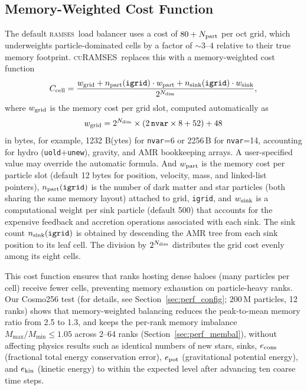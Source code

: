 \documentclass[fleqn,usenatbib]{mnras}
\newcommand{\ramses}{\textsc{ramses}}
\newcommand{\curamses}{\textsc{cuRAMSES}}
\newcommand{\twotondim}{2^{N_{\rm dim}}}
\newcommand{\code}[1]{\texttt{#1}}
\begin{document}
\subsection{Memory-Weighted Cost Function}
\label{sec:ksec_membal}

The default \ramses\ load balancer uses a cost of $80 + N_{\rm part}$
per oct grid, which underweights particle-dominated cells by a factor of
${\sim}3$--$4$ relative to their true memory footprint.
\curamses\ replaces this with a memory-weighted cost function
\begin{equation}
C_{\rm cell} = {{w_{\rm grid} +
n_{\rm part}({\code{igrid}}) \cdot w_{\rm part} +
n_{\rm sink}({\code{igrid}}) \cdot w_{\rm sink}
\label{eq:cost_function}} \over 2^{N_{\rm dim}}},
\end{equation}
where $w_{\rm grid}$ is the memory cost per grid slot, computed
automatically as 
\begin{equation}
	w_{\rm grid} = 2^{N_{\rm dim}} \times (2\,\code{nvar}\times 8 + 52) + 48
\end{equation}
in bytes, for example,  1232 B(ytes) for \code{nvar}=6 or 2256\,B for \code{nvar}=14,
accounting for hydro (\code{uold}+\code{unew}), gravity, and AMR bookkeeping arrays.
A user-specified value may override the automatic formula. And
$w_{\rm part}$ is the memory cost per particle slot (default 12 bytes
for position, velocity, mass, and linked-list pointers),
$n_{\rm part}({\code{igrid}})$ is the number of dark matter and star
particles (both sharing the same memory layout) attached to grid,
\code{igrid}, and $w_{\rm sink}$ is a computational weight per sink
particle (default 500) that accounts for the expensive feedback and
accretion operations associated with each sink. The sink count
$n_{\rm sink}({\code{igrid}})$ is obtained by descending the AMR tree
from each sink position to its leaf cell.
The division by $\twotondim$ distributes the grid
cost evenly among its eight cells.

This cost function ensures that ranks hosting dense haloes (many
particles per cell) receive fewer cells, preventing memory exhaustion
on particle-heavy ranks.
Our Cosmo256 test (for details, see Section~\ref{sec:perf_config}; $200\,\mathrm{M}$ particles, 12 ranks) shows that
memory-weighted balancing reduces the peak-to-mean memory ratio from
2.5 to 1.3, and keeps the per-rank memory imbalance
$M_{\max}/M_{\min} \le 1.05$ across 2--64 ranks
(Section~\ref{sec:perf_membal}), without affecting physics results such as identical numbers of new stars, sinks,
$e_{\rm cons}$ (fractional total energy conservation error),
$e_{\rm pot}$ (gravitational potential energy), and
$e_{\rm kin}$ (kinetic energy)
to within the expected level after advancing ten coarse time steps.
\end{document}
